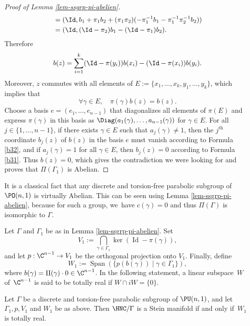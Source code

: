 \begin{proof}[Proof of Lemma \ref{lem-ssgrp-pi-abelien}]
\begin{align*}
&= (\Id,b_1+\pi_1b_2 +(\pi_1\pi_2)(-\pi_1^{-1}b_1 - \pi_1^{-1}\pi_2^{-1}b_2))\\
&= (\Id,(\Id-\pi_2)b_1-(\Id-\pi_1)b_2).
\end{align*}
Therefore
\begin{equation}\label{b31}
b(z)=\sum_{i=1}^{k}(\Id-\pi(y_i))b(x_i)-(\Id-\pi(x_i))b(y_i).
\end{equation}
Moreover, $z$ commutes with all elements of $E:=\{x_1,\dots,x_k,y_1,\dots,y_k\}$, which implies that
\begin{equation}\label{b32}
\forall \gamma \in E,\quad \pi(\gamma)b(z)=b(z).
\end{equation}
Choose a basis $e=(e_1,\dots,e_{n-1})$ that diagonalizes all elements of $\pi(E)$ and express $\pi(\gamma)$ in this basis as $\Diag(a_1(\gamma),\dots,a_{n-1}(\gamma))$ for $\gamma\in E$. For all $j\in\{1,\dots,n-1\}$, if there exists $\gamma\in E$ such that $a_j(\gamma)\ne 1$, then the $j^{\text{th}}$ coordinate $b_j(z)$ of $b(z)$ in the basis $e$ must vanish according to Formula \eqref{b32}, and if $a_j(\gamma)= 1$ for all $\gamma\in E$, then $b_j(z)=0$ according to Formula \eqref{b31}. Thus $b(z)=0$, which gives the contradiction we were looking for and proves that $\Pi(\Gamma_1)$ is Abelian.
\end{proof}

\begin{remark}
It is a classical fact that any discrete and torsion-free parabolic subgroup of $\PO(n,1)$ is virtually Abelian. This can be seen using Lemma \ref{lem-ssgrp-pi-abelien}, because for such a group, we~have $c(\gamma)=0$ and thus $\Pi(\Gamma)$ is isomorphic to $\Gamma$.
\end{remark}

Let $\Gamma$ and $\Gamma_1$ be as in Lemma \ref{lem-ssgrp-pi-abelien}. Set
\begin{equation*}
V_1:= \bigcap_{\gamma\in \Gamma_1}\ker(\operatorname{Id}-\pi(\gamma)),
\end{equation*} and let $p:\C^{n-1}\to V_1$ be the orthogonal projection onto $V_1$. Finally, define
\begin{equation*}
W_1:= \operatorname{Span}(\{p(b(\gamma)) \mid \gamma\in \Gamma_1\}),
\end{equation*}
where $b(\gamma)=\Pi(\gamma)\cdot 0 \in \C^{n-1}$. In the following statement, a linear subspace~$W$ of~$\C^{n-1}$ is said to be totally real if $W\cap iW=\{0\}$.

\begin{theorem}\label{thm-caracterisation-parab-stein}
Let $\Gamma$ be a discrete and torsion-free parabolic subgroup of $\PU(n,1)$, and let $\Gamma_1,p, V_1$ and $W_1$ be as above. Then $\HNC/\Gamma$ is a Stein manifold if and only if~$W_1$ is totally real.
\end{theorem}

